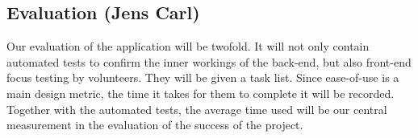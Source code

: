 \subsection{Evaluation (Jens Carl)}
Our evaluation of the application will be twofold. It will not only contain automated tests to confirm the inner workings of the back-end, but also front-end focus testing by volunteers. They will be given a task list. Since ease-of-use is a main design metric, the time it takes for them to complete it will be recorded. Together with the automated tests, the average time used will be our central measurement in the evaluation of the success of the project. 

